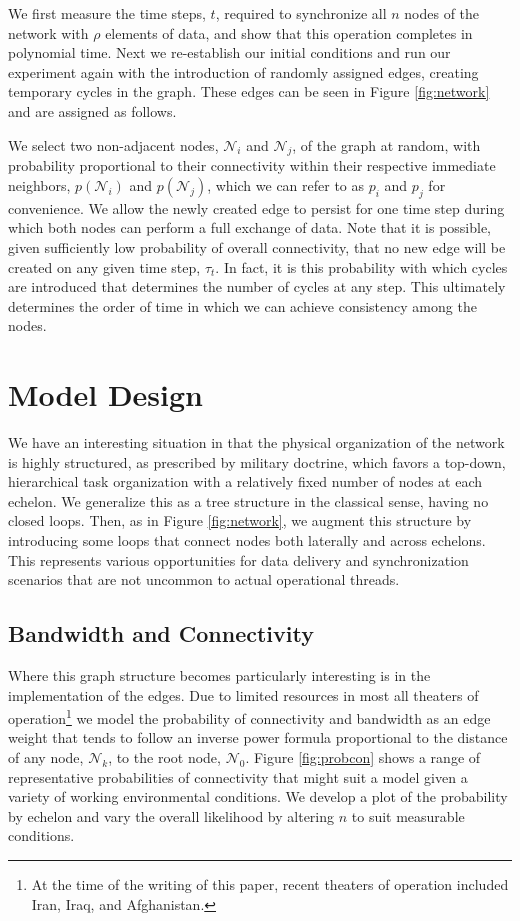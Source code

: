 \documentclass[10pt]{./IEEEtran}
\begin{document}
We first measure the time steps, $t$, required to synchronize all $n$ nodes of the network with $\rho$ elements of data, and show that this operation completes in polynomial time.  Next we re-establish our initial conditions and run our experiment again with the introduction of randomly assigned edges, creating temporary cycles in the graph.  These edges can be seen in Figure \ref{fig:network} and are assigned as follows.

We select two non-adjacent nodes, $\mathscr{N}_{i}$ and $\mathscr{N}_{j}$, of the graph at random, with probability proportional to their connectivity within their respective immediate neighbors, $p(\mathscr{N}_{i})$ and $p(\mathscr{N}_{j})$, which we can refer to as $p_{i}$ and $p_{j}$ for convenience.  We allow the newly created edge to persist for one time step during which both nodes can perform a full exchange of data.  Note that it is possible, given sufficiently low probability of overall connectivity, that no new edge will be created on any given time step, $\tau_{t}$.  In fact, it is this probability with which cycles are introduced that determines the number of cycles at any step.  This ultimately determines the order of time in which we can achieve consistency among the nodes.


\section{Model Design}
\label{sec:model}
We have an interesting situation in that the physical organization of the network is highly structured, as prescribed by military doctrine, which favors a top-down, hierarchical task organization with a relatively fixed number of nodes at each echelon.  We generalize this as a tree structure in the classical sense, having no closed loops.  Then, as in Figure \ref{fig:network}, we augment this structure by introducing some loops that connect nodes both laterally and across echelons.  This represents various opportunities for data delivery and synchronization scenarios that are not uncommon to actual operational threads.

\subsection{Bandwidth and Connectivity}

Where this graph structure becomes particularly interesting is in the implementation of the edges.  Due to limited resources in most all theaters of operation\footnote{At the time of the writing of this paper, recent theaters of operation included Iran, Iraq, and Afghanistan.} we model the probability of connectivity and bandwidth as an edge weight that tends to follow an inverse power formula proportional to the distance of any node, $\mathscr{N}_{k}$, to the root node, $\mathscr{N}_{0}$.  Figure \ref{fig:probcon} shows a range of representative probabilities of connectivity that might suit a model given a variety of working environmental conditions.  We develop a plot of the probability by echelon and vary the overall likelihood by altering $n$ to suit measurable conditions.
\end{document}
